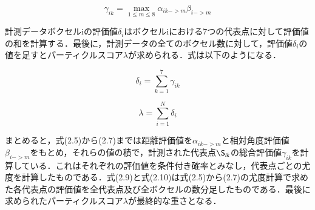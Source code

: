 \begin{equation}
\gamma_{ik} = \max_{1 \leq m \leq 8}\alpha_{ik->m}\beta_{i->m}
\end{equation}

計測データボクセルiの評価値$\delta_{i}$はボクセルiにおける7つの代表点に対して評価値の和を計算する．最後に，計測データの全てのボクセル数に対して，評価値$\delta_{i}$の値を足すとパーティクルスコア$\lambda$が求められる．式は以下のようになる．\par

\begin{equation}
\delta_{i} = \sum_{k=1}^{7}\gamma_{ik}
\end{equation}

\begin{equation}
\lambda = \sum_{i=1}^{N}\delta_{i}
\end{equation}

まとめると，式(2.5)から(2.7)までは距離評価値を$\alpha_{ik->m}$と相対角度評価値$\beta_{i->m}$をもとめ，それらの値の積で，計測された代表点$\S_{ik}$の総合評価値$\gamma_{ik}$を計算している．これはそれぞれの評価値を条件付き確率とみなし，代表点ごとの尤度を計算したものである．式(2.9)と式(2.10)は式(2.5)から(2.7)の尤度計算で求めた各代表点の評価値を全代表点及び全ボクセルの数分足したものである．最後に求められたパーティクルスコア$\lambda$が最終的な重さとなる．


